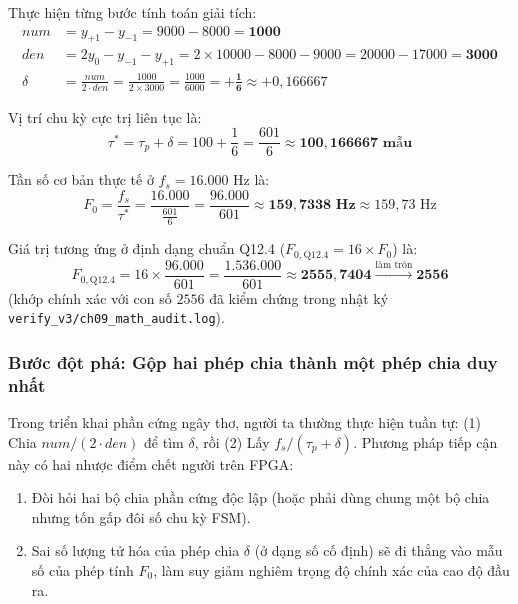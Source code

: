 Thực hiện từng bước tính toán giải tích:
\begin{align}
num &= y_{+1} - y_{-1} = 9000 - 8000 = \mathbf{1000} \\
den &= 2y_0 - y_{-1} - y_{+1} = 2 \times 10000 - 8000 - 9000 = 20000 - 17000 = \mathbf{3000} \\
\delta &= \frac{num}{2 \cdot den} = \frac{1000}{2 \times 3000} = \frac{1000}{6000} = \mathbf{+\frac{1}{6}} \approx +0{,}166667
\end{align}

Vị trí chu kỳ cực trị liên tục là:
\begin{equation}
\tau^* = \tau_p + \delta = 100 + \frac{1}{6} = \frac{601}{6} \approx \mathbf{100{,}166667\text{ mẫu}}
\end{equation}

Tần số cơ bản thực tế ở $f_s = 16.000\text{ Hz}$ là:
\begin{equation}
F_0 = \frac{f_s}{\tau^*} = \frac{16.000}{\frac{601}{6}} = \frac{96.000}{601} \approx \mathbf{159{,}7338\text{ Hz}} \approx 159{,}73\text{ Hz}
\end{equation}

Giá trị tương ứng ở định dạng chuẩn Q12.4 ($F_{0, \text{Q12.4}} = 16 \times F_0$) là:
\begin{equation}
F_{0, \text{Q12.4}} = 16 \times \frac{96.000}{601} = \frac{1.536.000}{601} \approx \mathbf{2555{,}7404} \xrightarrow{\text{làm tròn}} \mathbf{2556}
\end{equation}
(khớp chính xác với con số $2556$ đã kiểm chứng trong nhật ký \texttt{verify\_v3/ch09\_math\_audit.log}).

\subsubsection*{Bước đột phá: Gộp hai phép chia thành một phép chia duy nhất}
Trong triển khai phần cứng ngây thơ, người ta thường thực hiện tuần tự: (1) Chia $num / (2 \cdot den)$ để tìm $\delta$, rồi (2) Lấy $f_s / (\tau_p + \delta)$. Phương pháp tiếp cận này có hai nhược điểm chết người trên FPGA:
\begin{enumerate}[leftmargin=1.5em, itemsep=2pt]
    \item Đòi hỏi hai bộ chia phần cứng độc lập (hoặc phải dùng chung một bộ chia nhưng tốn gấp đôi số chu kỳ FSM).
    \item Sai số lượng tử hóa của phép chia $\delta$ (ở dạng số cố định) sẽ đi thẳng vào mẫu số của phép tính $F_0$, làm suy giảm nghiêm trọng độ chính xác của cao độ đầu ra.
\end{enumerate}

